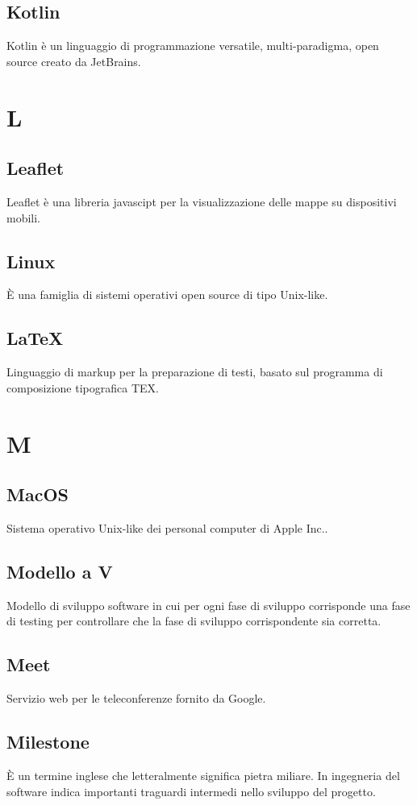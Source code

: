 \subsection{Kotlin} Kotlin è un linguaggio di programmazione versatile, multi-paradigma, open source creato da JetBrains.
\newpage \section{L}
\subsection{Leaflet} Leaflet è una libreria javascipt per la visualizzazione delle mappe su dispositivi mobili.
\subsection{Linux} È una famiglia di sistemi operativi open source di tipo Unix-like.
\subsection{\LaTeX} Linguaggio di markup per la preparazione di testi, basato sul programma di composizione tipografica TEX.
\newpage \section{M}
\subsection{MacOS} Sistema operativo Unix-like dei personal computer di Apple Inc..
\subsection{Modello a V} Modello di sviluppo software in cui per ogni fase di sviluppo corrisponde una fase di testing per controllare che la fase di sviluppo corrispondente sia corretta.
\subsection{Meet} Servizio web per le teleconferenze fornito da Google.
\subsection{Milestone} È un termine inglese che letteralmente significa pietra miliare. In ingegneria del software indica importanti traguardi intermedi nello sviluppo del progetto.
